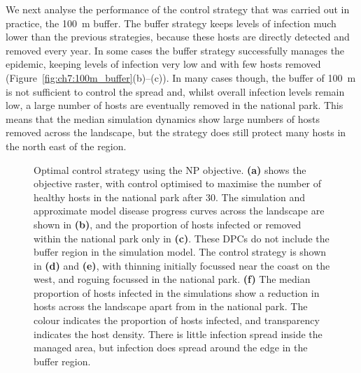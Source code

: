 We next analyse the performance of the control strategy that was carried out in practice, the \SI{100}{\meter} buffer. The buffer strategy keeps levels of infection much lower than the previous strategies, because these hosts are directly detected and removed every year. In some cases the buffer strategy successfully manages the epidemic, keeping levels of infection very low and with few hosts removed (Figure~\ref{fig:ch7:100m_buffer}(b)--(c)). In many cases though, the buffer of \SI{100}{\meter} is not sufficient to control the spread and, whilst overall infection levels remain low, a large number of hosts are eventually removed in the national park. This means that the median simulation dynamics show large numbers of hosts removed across the landscape, but the strategy does still protect many hosts in the north east of the region.
{
\makeatletter
\setlength{\@fptop}{10\p@} 
\setlength{\@fpbot}{0\p@ \@plus 1fil}
\makeatletter

\begin{figure}[H]
    \begin{center}
        \caption[Optimal control strategy to protect the national park]{Optimal control strategy using the NP objective. \textbf{(a)} shows the objective raster, with control optimised to maximise the number of healthy hosts in the national park after \SI{30}{\years}. The simulation and approximate model disease progress curves across the landscape are shown in \textbf{(b)}, and the proportion of hosts infected or removed within the national park only in \textbf{(c)}. These DPCs do not include the buffer region in the simulation model. The control strategy is shown in \textbf{(d)} and \textbf{(e)}, with thinning initially focussed near the coast on the west, and roguing focussed in the national park. \textbf{(f)} The median proportion of hosts infected in the simulations show a reduction in hosts across the landscape apart from in the national park. The colour indicates the proportion of hosts infected, and transparency indicates the host density. There is little infection spread inside the managed area, but infection does spread around the edge in the buffer region.\label{fig:ch7:ol_np}}
    \end{center}
\end{figure}

}
